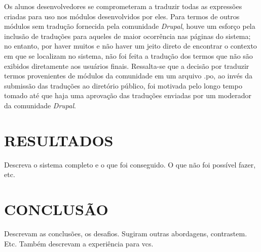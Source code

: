 \documentclass[a4paper]{article}
\begin{document}
Os alunos desenvolvedores se comprometeram a traduzir todas as expressões criadas para uso nos módulos desenvolvidos por eles. Para termos de outros módulos sem tradução fornecida pela comunidade \textit{Drupal}, houve um esforço pela inclusão de traduções para aqueles de maior ocorrência nas páginas do sistema; no entanto, por haver muitos e não haver um jeito direto de encontrar o contexto em que se localizam no sistema, não foi feita a tradução dos termos que não são exibidos diretamente aos usuários finais. Ressalta-se que a decisão por traduzir termos provenientes de módulos da comunidade em um arquivo .po, ao invés da submissão das traduções ao diretório público, foi motivada pelo longo tempo tomado até que haja uma aprovação das traduções enviadas por um moderador da comunidade \textit{Drupal}.

\pagebreak
\section{RESULTADOS}
Descreva o sistema completo e o que foi conseguido. O que não foi possível fazer, etc.



\pagebreak
\section{CONCLUSÃO}
Descrevam as conclusões, os desafios. Sugiram outras abordagens, contrastem. Etc. Também descrevam a experiência para vcs.













\pagebreak
\end{document}
